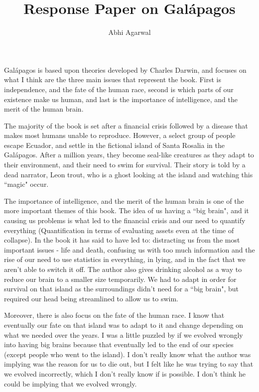 \documentclass[11pt, oneside]{article}   	%
\title{Response Paper on Gal\'apagos}
\author{Abhi Agarwal}
\date{}
\begin{document}
\maketitle

\par Gal\'apagos is based upon theories developed by Charles Darwin, and focuses on what I think are the three main issues that represent the book. First is independence, and the fate of the human race, second is which parts of our existence make us human, and last is the importance of intelligence, and the merit of the human brain. 

\par The majority of the book is set after a financial crisis followed by a disease that makes most humans unable to reproduce. However, a select group of people escape Ecuador, and settle in the fictional island of Santa Rosalia in the Gal\'apagos. After a million years, they become seal-like creatures as they adapt to their environment, and their need to swim for survival. Their story is told by a dead narrator, Leon trout, who is a ghost looking at the island and watching this ``magic" occur.

\par The importance of intelligence, and the merit of the human brain is one of the more important themes of this book. The idea of us having a ``big brain", and it causing us problems is what led to the financial crisis and our need to quantify everything (Quantification in terms of evaluating assets even at the time of collapse). In the book it has said to have led to: distracting us from the most important issues - life and death, confusing us with too much information and the rise of our need to use statistics in everything, in lying, and in the fact that we aren't able to switch it off. The author also gives drinking alcohol as a way to reduce our brain to a smaller size temporarily. We had to adapt in order for survival on that island as the surroundings didn't need for a ``big brain", but required our head being streamlined to allow us to swim.

\par Moreover, there is also focus on the fate of the human race. I know that eventually our fate on that island was to adapt to it and change depending on what we needed over the years. I was a little puzzled by if we evolved wrongly into having big brains because that eventually led to the end of our species (except people who went to the island). I don't really know what the author was implying was the reason for us to die out, but I felt like he was trying to say that we evolved incorrectly, which I don't really know if is possible. I don't think he could be implying that we evolved wrongly.
\end{document}
